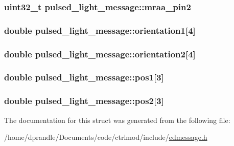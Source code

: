 \hypertarget{structpulsed__light__message_aa36ddffc56849ff69e4cc17084f9635d}{
\subsubsection[{mraa\-\_\-pin2}]{\setlength{\rightskip}{0pt plus 5cm}uint32\-\_\-t pulsed\-\_\-light\-\_\-message\-::mraa\-\_\-pin2}}\label{structpulsed__light__message_aa36ddffc56849ff69e4cc17084f9635d}
\hypertarget{structpulsed__light__message_aa50c043648567a006240ad6c39766898}{
\subsubsection[{orientation1}]{\setlength{\rightskip}{0pt plus 5cm}double pulsed\-\_\-light\-\_\-message\-::orientation1\mbox{[}4\mbox{]}}}\label{structpulsed__light__message_aa50c043648567a006240ad6c39766898}
\hypertarget{structpulsed__light__message_a26ad20b42bc70bdf6299b4f69c8f3c91}{
\subsubsection[{orientation2}]{\setlength{\rightskip}{0pt plus 5cm}double pulsed\-\_\-light\-\_\-message\-::orientation2\mbox{[}4\mbox{]}}}\label{structpulsed__light__message_a26ad20b42bc70bdf6299b4f69c8f3c91}
\hypertarget{structpulsed__light__message_ade8c428c9e6d99625033f3b0d74f96ad}{
\subsubsection[{pos1}]{\setlength{\rightskip}{0pt plus 5cm}double pulsed\-\_\-light\-\_\-message\-::pos1\mbox{[}3\mbox{]}}}\label{structpulsed__light__message_ade8c428c9e6d99625033f3b0d74f96ad}
\hypertarget{structpulsed__light__message_a598e2ddd86da341b3703b9a1e6a81d27}{
\subsubsection[{pos2}]{\setlength{\rightskip}{0pt plus 5cm}double pulsed\-\_\-light\-\_\-message\-::pos2\mbox{[}3\mbox{]}}}\label{structpulsed__light__message_a598e2ddd86da341b3703b9a1e6a81d27}


The documentation for this struct was generated from the following file\-:\begin{DoxyCompactItemize}
\item 
/home/dprandle/\-Documents/code/ctrlmod/include/\hyperlink{edmessage_8h}{edmessage.\-h}\end{DoxyCompactItemize}
